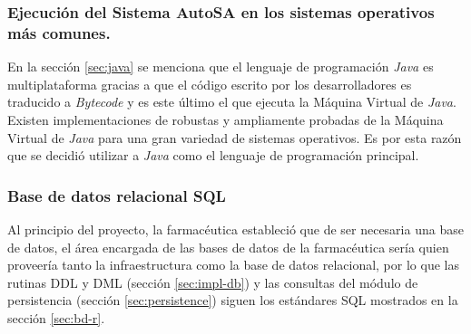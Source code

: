 \subsubsection{Ejecución del Sistema AutoSA en los sistemas operativos más comunes.}
En la sección \ref{sec:java} se menciona que el lenguaje de programación \textit{Java} es multiplataforma gracias a que el código escrito por los desarrolladores es traducido a \textit{Bytecode} y es este último el que ejecuta la Máquina Virtual de \textit{Java}. Existen implementaciones de robustas y ampliamente probadas de la Máquina Virtual de \textit{Java} para una gran variedad de sistemas operativos. Es por esta razón que se decidió utilizar a \textit{Java} como el lenguaje de programación principal.

\subsubsection{Base de datos relacional SQL}
Al principio del proyecto, la farmacéutica estableció que de ser necesaria una base de datos, el área encargada de las bases de datos de la farmacéutica sería quien proveería tanto la infraestructura como la base de datos relacional, por lo que las rutinas DDL y DML (sección \ref{sec:impl-db}) y las consultas del módulo de persistencia (sección \ref{sec:persistence}) siguen los estándares SQL mostrados en la sección \ref{sec:bd-r}.

